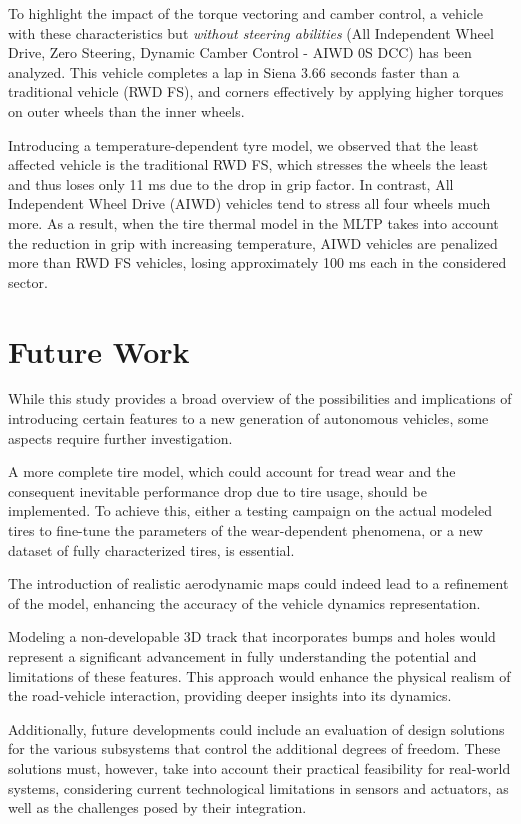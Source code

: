 To highlight the impact of the torque vectoring and camber control, a vehicle with these characteristics but \emph{without steering abilities} (All Independent Wheel Drive, Zero Steering, Dynamic Camber Control - AIWD 0S DCC) has been analyzed.
This vehicle completes a lap in Siena 3.66 seconds faster than a traditional vehicle (RWD FS), and corners effectively by applying higher torques on outer wheels than the inner wheels.

Introducing a temperature-dependent tyre model, we observed that the least affected vehicle is the traditional RWD FS, which stresses the wheels the least and thus loses only 11 ms due to the drop in grip factor. In contrast, All Independent Wheel Drive (AIWD) vehicles tend to stress all four wheels much more. As a result, when the tire thermal model in the MLTP takes into account the reduction in grip with increasing temperature, AIWD vehicles are penalized more than RWD FS vehicles, losing approximately 100 ms each in the considered sector.

\section{Future Work}

While this study provides a broad overview of the possibilities and implications of introducing certain features to a new generation of autonomous vehicles, some aspects require further investigation.

A more complete tire model, which could account for tread wear and the consequent inevitable performance drop due to tire usage, should be implemented. To achieve this, either a testing campaign on the actual modeled tires to fine-tune the parameters of the wear-dependent phenomena, or a new dataset of fully characterized tires, is essential.

The introduction of realistic aerodynamic maps could indeed lead to a refinement of the model, enhancing the accuracy of the vehicle dynamics representation.

Modeling a non-developable 3D track that incorporates bumps and holes would represent a significant advancement in fully understanding the potential and limitations of these features. This approach would enhance the physical realism of the road-vehicle interaction, providing deeper insights into its dynamics.

Additionally, future developments could include an evaluation of design solutions for the various subsystems that control the additional degrees of freedom. These solutions must, however, take into account their practical feasibility for real-world systems, considering current technological limitations in sensors and actuators, as well as the challenges posed by their integration. 